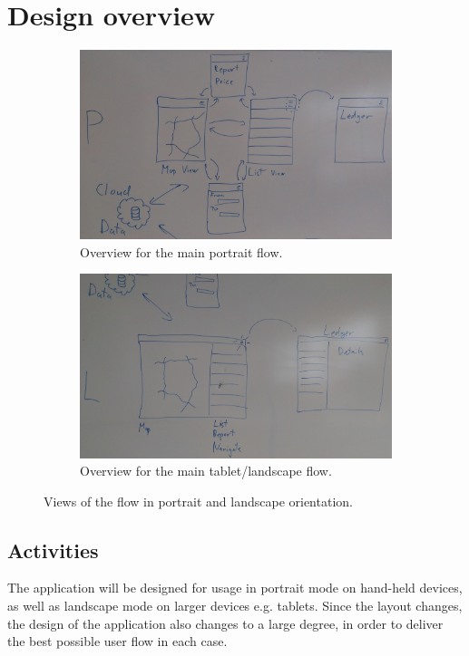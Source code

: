 
\chapter{Design overview}


\begin{figure}[h]
	\centering
	\begin{subfigure}[b]{0.45\textwidth}
		\centering
		\includegraphics[width=\textwidth]{P.jpg}
		\caption{Overview for the main portrait flow.}
		\label{fig:p}
	\end{subfigure}
	\quad
	\begin{subfigure}[b]{0.45\textwidth}
		\centering
		\includegraphics[width=\textwidth]{L.jpg}
		\caption{Overview for the main tablet/landscape flow.}
		\label{fig:l}
	\end{subfigure}
	\caption{Views of the flow in portrait and landscape orientation.}
\end{figure}

\section{Activities}
The application will be designed for usage in portrait mode on hand-held devices, as well as landscape mode on larger devices e.g. tablets. Since the layout changes, the design of the application also changes to a large degree, in order to deliver the best possible user flow in each case.

